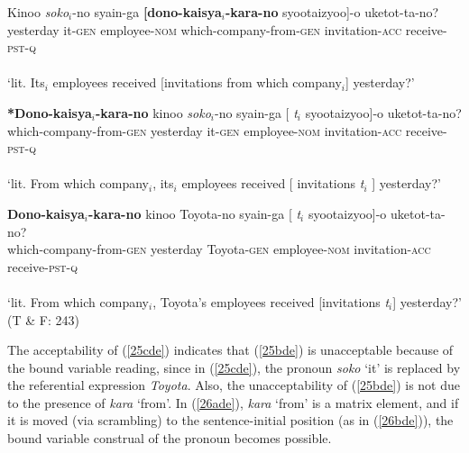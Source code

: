 \documentclass[
    output=paper,
    colorlinks,
    citecolor=brown,
]{langscibook}
\begin{document}
\begin{exe}
\ex \label{25de}
\begin{xlist}
\ex \label{25ade}
\gll *Kinoo \textit{soko}$_{i}$-no syain-ga           \textbf{[dono-kaisya$_{i}$-kara-no} syootaizyoo]-o uketot-ta-no? \\
yesterday it-\textsc{gen} employee-\textsc{nom} which-company-from-\textsc{gen} invitation-\textsc{acc} receive-\textsc{pst}-\textsc{q}\\\\
 ‘lit. Its$_{i}$ employees received [invitations from which company$_{i}$]  yesterday?’


\ex \label{25bde}
\gll \textbf{*Dono-kaisya}$_{i}$\textbf{-kara-no}  kinoo  \textit{soko}$_{i}$-no syain-ga [ \textit{t}$_{i}$    syootaizyoo]-o uketot-ta-no?\\
which-company-from-\textsc{gen} yesterday it-\textsc{gen} employee-\textsc{nom} {} {} invitation-\textsc{acc} receive-\textsc{pst}-\textsc{q}\\\\
‘lit. From which company$_{i}$, its$_{i}$ employees received [ invitations \textit{t}$_{i}$ ] yesterday?’



\ex \label{25cde}
\gll \textbf{Dono-kaisya}$_{i}$\textbf{-kara-no}  kinoo Toyota-no  syain-ga  [ \textit{t}$_{i}$   syootaizyoo]-o uketot-ta-no?\\
which-company-from-\textsc{gen} yesterday Toyota-\textsc{gen} employee-\textsc{nom} {} {} invitation-\textsc{acc} receive-\textsc{pst}-\textsc{q}\\\\
‘lit. From which company$_{i}$, Toyota's employees received [invitations \textit{t}$_{i}$] yesterday?’\\
\hspace{82mm} (T \& F: 243)	
\end{xlist}
\end{exe}

The acceptability of (\ref{25cde}) indicates that (\ref{25bde}) is unacceptable because of the bound variable reading, since in (\ref{25cde}), the pronoun \textit{soko} ‘it’ is replaced by the referential expression \textit{Toyota}. Also, the unacceptability of (\ref{25bde}) is not due to the presence of \textit{kara} ‘from’. In (\ref{26ade}), \textit{kara} ‘from’ is a matrix element, and if it is moved (via scrambling) to the sentence-initial position (as in (\ref{26bde})), the bound variable construal of the pronoun becomes possible.
\end{document}
